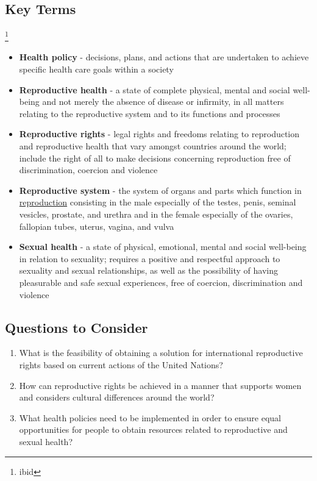 \documentclass[10pt, letterpaper]{article}
\begin{document}
\subsection{Key Terms}\footnote{ibid}
\begin{itemize}
\item 
\textbf{Health policy} - decisions, plans, and actions that are undertaken
to achieve specific health care goals within a society
\item 

\textbf{Reproductive health} - a state of complete physical, mental and
social well-being and not merely the absence of disease or infirmity, in
all matters relating to the reproductive system and to its functions and
processes
\item 

\textbf{Reproductive rights} - legal rights and freedoms relating to
reproduction and reproductive health that vary amongst countries around
the world; include the right of all to make decisions concerning
reproduction free of discrimination, coercion and violence
\item 

\textbf{Reproductive system} - the system of organs and parts which
function in
\href{https://www.merriam-webster.com/dictionary/reproduction}{reproduction}
consisting in the male especially of the testes, penis, seminal
vesicles, prostate, and urethra and in the female especially of the
ovaries, fallopian tubes, uterus, vagina, and vulva
\item 

\textbf{Sexual health} - a state of physical, emotional, mental and social
well-being in relation to sexuality; requires a positive and respectful
approach to sexuality and sexual relationships, as well as the
possibility of having pleasurable and safe sexual experiences, free of
coercion, discrimination and violence
\end{itemize}

\subsection{Questions to Consider}

\begin{enumerate}
\def\labelenumi{\arabic{enumi})}
\item
  
  What is the feasibility of obtaining a solution for international
  reproductive rights based on current actions of the United Nations?
  
\item
  
  How can reproductive rights be achieved in a manner that supports
  women and considers cultural differences around the world?
  
\item
  
  What health policies need to be implemented in order to ensure equal
  opportunities for people to obtain resources related to reproductive
  and sexual health?
  
\end{enumerate}
\end{document}
